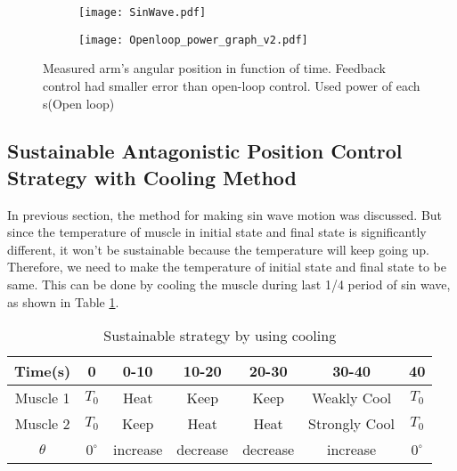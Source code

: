 
\begin{figure}[t]
	\centering
	\begin{subfigure}[t]{0.44\textwidth}
		\texttt{[image: SinWave.pdf]}
		\caption{\label{positionControl_sin}}
	\end{subfigure}%
	\begin{subfigure}[t]{0.50\textwidth}
		\texttt{[image: Openloop\_power\_graph\_v2.pdf]}
		\caption{\label{positionControl_sin_power}}
	\end{subfigure}
	\caption[\Apc by only heating]{ Measured arm's angular position in function of time. Feedback control had smaller error than open-loop control.  Used power of each \scpnospace s(Open loop)}
	\label{positionControl}
\end{figure}

\clearpage

\subsection{Sustainable Antagonistic Position Control Strategy with Cooling Method}\label{section_simulation}
In previous section, the method for making sin wave motion was discussed. But since the temperature of muscle in initial state and final state is significantly different, it won't be sustainable because the temperature will keep going up. Therefore, we need to make the temperature of initial state and final state to be same. This can be done by cooling the muscle during last 1/4 period of sin wave, as shown in Table \ref{table_apc_sustain}.

\begin{table}[b]
	\caption{Sustainable \apc strategy by using cooling}
	\label{table_apc_sustain}
	\begin{center}
		\begin{tabular}{c||c|c|c|c|c|c}
			\hline
			Time(s) & 0 & 0-10 & 10-20 & 20-30 & 30-40 & 40 \\
			\hline
			Muscle 1 & $T_0$ & Heat & Keep & Keep & Weakly Cool & $T_0$ \\
			Muscle 2 & $T_0$ & Keep & Heat & Heat & Strongly Cool & $T_0$ \\
			\hline
			$\theta$ & $0^{\circ}$ & increase & decrease & decrease & increase & $0^{\circ}$ \\
			\hline
		\end{tabular}
	\end{center}
\end{table}

